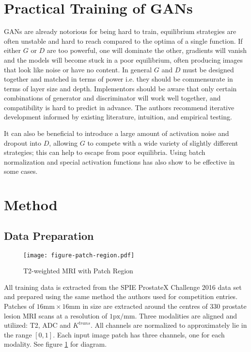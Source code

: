 \documentclass[a4paper,12pt]{spieman}  %
\newcommand{\ktrans}{$K^{\mathit{trans}}$}
\begin{document}
\begin{spacing}{1}
\section{Practical Training of GANs}

	GANs are already notorious for being hard to train, equilibrium
	strategies are often unstable and hard to reach compared to the optima
	of a single function. If either $G$ or $D$ are too powerful, one will
	dominate the other, gradients will vanish and the models will become
	stuck in a poor equilibrium, often producing images that look like
	noise or have no content. In general $G$ and $D$ must be designed
	together and matched in terms of power i.e. they should be commensurate
	in terms of layer size and depth.  Implementors should be aware that
	only certain combinations of generator and discriminator will work well
	together, and compatibility is hard to predict in advance. The authors
	recommend iterative development informed by existing literature,
	intuition, and empirical testing.

	It can also be beneficial to introduce a large amount of activation
	noise and dropout into $D$, allowing $G$ to compete with a wide variety
	of slightly different strategies; this can help to escape from poor
	equilibria. Using batch normalization and special activation functions
	has also show to be effective in some
	cases\cite{DBLP:journals/corr/RadfordMC15}.


\section{Method}
\subsection{Data Preparation}

\begin{figure}
\begin{center}
  \texttt{[image: figure-patch-region.pdf]}
\end{center}
\caption{T2-weighted MRI with Patch Region}
\label{fig:patch}
\end{figure}

	All training data is extracted from the SPIE ProstateX Challenge 2016
	data set and prepared using the same method the authors used for
	competition entries\cite{kitchen2017}.  Patches of $16\text{mm} \times
	16\text{mm}$ in size are extracted around the centres of 330 prostate
	lesion MRI scans at a resolution of $1\text{px}/\text{mm}$. Three
	modalities are aligned and utilized: T2, ADC and \ktrans{}.
	All channels are normalized to approximately lie in the range $[0, 1]$.
	Each input image patch has three channels, one for each modality. See
	figure \ref{fig:patch} for diagram.



\end{spacing}
\end{document}
